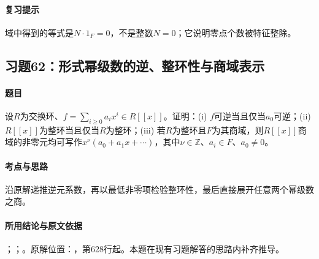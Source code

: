 \paragraph{复习提示}

域中得到的等式是$N\cdot1_F=0$，不是整数$N=0$；它说明零点个数被特征整除。



\subsection{习题62：形式幂级数的逆、整环性与商域表示}

\label{ex:3:62}

\paragraph{题目}

设$R$为交换环、$f=\sum_{i\geqslant0}a_ix^i\in R[[x]]$。证明：(i) $f$可逆当且仅当$a_0$可逆；(ii) $R[[x]]$为整环当且仅当$R$为整环；(iii) 若$R$为整环且$F$为其商域，则$R[[x]]$商域的非零元均可写作$x^\nu(a_0+a_1x+\cdots)$，其中$\nu\in\mathbb Z$、$a_i\in F$、$a_0\ne0$。

\paragraph{考点与思路}

沿原解递推逆元系数，再以最低非零项检验整环性，最后直接展开任意两个幂级数之商。

\paragraph{所用结论与原文依据}

；；。原解位置：，第628行起。本题在现有习题解答的思路内补齐推导。


